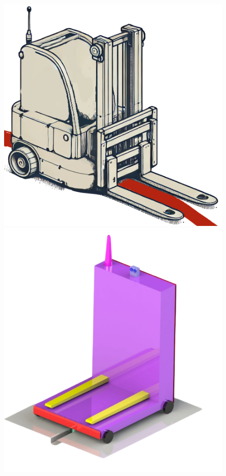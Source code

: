 \documentclass[12pt]{article}
\begin{document}
\begin{figure}[H]
    \centering
    \begin{minipage}{0.32\textwidth}
        \centering
        \includegraphics[width=\textwidth]{Simple_sketch_of_an_automated_forklift_robot_with_two_wheels_at_the_back_and_one_wheel_in_the_front.png}
    \end{minipage}%
    \hspace{0.01\textwidth}
    \begin{minipage}{0.32\textwidth}
        \centering
        \includegraphics[width=\textwidth]{anna&will's design (1).png}

\end{minipage}
\end{figure}
\end{document}
